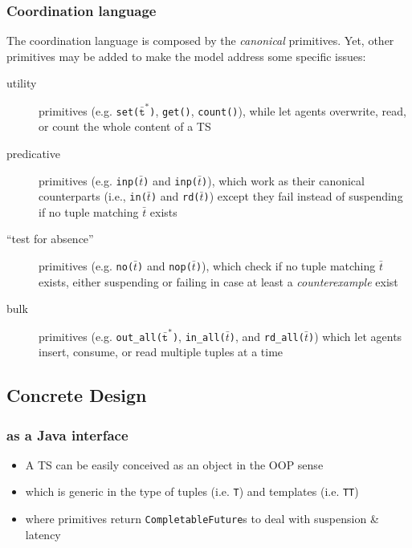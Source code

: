 \documentclass[presentation]{beamer}\mode<presentation>{\usetheme{AMSCesenaPurpleAndGold}}
\begin{document}
\begin{frame}%
	\frametitle{Coordination language}

	The \linda{} coordination language is composed by the \emph{canonical} primitives.
	Yet, other primitives may be added to make the model address some specific issues:
	\vfill
	\begin{description}

		\item[utility] primitives (e.g. \alert{\texttt{set($\bar{\mathtt{t}}^*$)}}, \alert{\texttt{get()}}, \alert{\texttt{count()}}), while let agents overwrite, read, or count the whole content of a TS

		\vfill

		\item[predicative] primitives (e.g. \alert{\texttt{inp($\bar t$)}} and \alert{\texttt{inp($\bar t$)}}), which work as their canonical counterparts (i.e., \texttt{in($\bar t$)} and \texttt{rd($\bar t$)}) except they fail instead of suspending if no tuple matching $\bar t$ exists

		\vfill

		\item[``test for absence''] primitives (e.g. \alert{\texttt{no($\bar t$)}} and \alert{\texttt{nop($\bar t$)}}), which check if no tuple matching $\bar t$ exists, either suspending or failing in case at least a \emph{counterexample} exist

		\vfill

		\item[bulk] primitives (e.g. \alert{\texttt{out\_all($\bar{\mathtt{t}}^*$)}}, \alert{\texttt{in\_all($\bar t$)}}, and \alert{\texttt{rd\_all($\bar t$)}}) which let agents insert, consume, or read multiple tuples at a time
	\end{description}

	\vfill

\end{frame}

\subsection{Concrete Design}

\begin{frame}%
	\frametitle{\linda{} as a Java interface}

	\begin{itemize}
		\item A TS can be easily conceived as an \alert{object} in the OOP sense

		\vfill

		\item which is generic in the type of tuples (i.e. \texttt{\alert{T}}) and templates (i.e. \texttt{\alert{TT}})

		\vfill

		\item where primitives return \alert{\texttt{CompletableFuture}s} to deal with suspension \& latency
	\end{itemize}

	\vfill

	
\end{frame}
\end{document}
